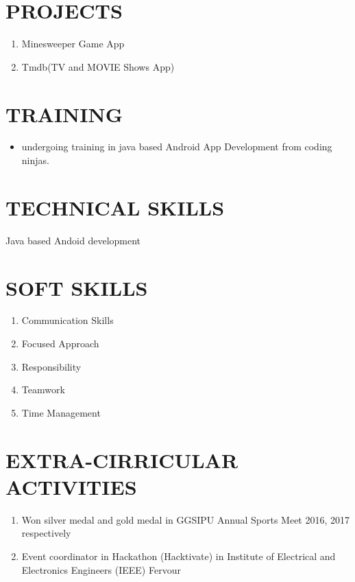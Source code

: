 \documentclass{article}
\begin{document}
\section{PROJECTS}
\Large
\begin{enumerate}
\item Minesweeper Game App
\item Tmdb(TV and MOVIE Shows App) 
\end{enumerate}

\section{TRAINING}
\begin{itemize}
\item undergoing training in java based Android App Development from coding ninjas.
\end{itemize}
\section{TECHNICAL SKILLS}
Java based Andoid development\\

\section{SOFT SKILLS}
\begin{enumerate}
\item Communication Skills\\
\item Focused Approach\\
\item Responsibility\\
\item Teamwork\\
\item  Time Management\\
\end{enumerate}

\section{EXTRA-CIRRICULAR ACTIVITIES}
\begin{enumerate}
\item Won silver medal and gold medal in GGSIPU Annual Sports Meet 2016, 2017 respectively
\item Event coordinator in Hackathon (Hacktivate) in Institute of  Electrical and Electronics Engineers (IEEE) Fervour 
\end{enumerate}
\end{document}
